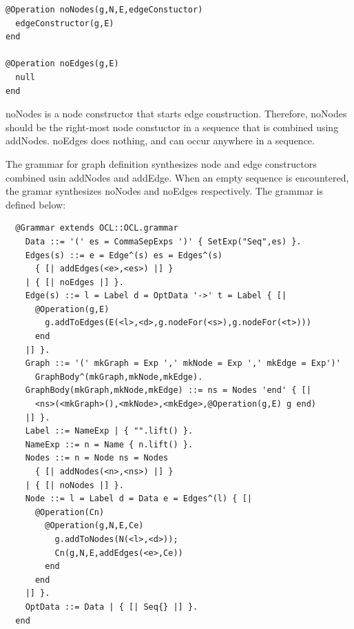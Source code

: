 \begin{lstlisting}
@Operation noNodes(g,N,E,edgeConstuctor)
  edgeConstructor(g,E)
end

@Operation noEdges(g,E)
  null
end
\end{lstlisting}
noNodes is a node constructor that starts edge construction. Therefore,
noNodes should be the right-most node constuctor in a sequence that
is combined using addNodes. noEdges does nothing, and can occur anywhere
in a sequence.

The grammar for graph definition synthesizes node and edge constructors
combined usin addNodes and addEdge. When an empty sequence is encountered,
the gramar synthesizes noNodes and noEdges respectively. The grammar
is defined below:

\begin{lstlisting}
  @Grammar extends OCL::OCL.grammar
    Data ::= '(' es = CommaSepExps ')' { SetExp("Seq",es) }.
    Edges(s) ::= e = Edge^(s) es = Edges^(s) 
      { [| addEdges(<e>,<es>) |] } 
    | { [| noEdges |] }.
    Edge(s) ::= l = Label d = OptData '->' t = Label { [| 
      @Operation(g,E)
        g.addToEdges(E(<l>,<d>,g.nodeFor(<s>),g.nodeFor(<t>)))
      end 
    |] }.
    Graph ::= '(' mkGraph = Exp ',' mkNode = Exp ',' mkEdge = Exp')' 
      GraphBody^(mkGraph,mkNode,mkEdge).
    GraphBody(mkGraph,mkNode,mkEdge) ::= ns = Nodes 'end' { [| 
      <ns>(<mkGraph>(),<mkNode>,<mkEdge>,@Operation(g,E) g end) 
    |] }.
    Label ::= NameExp | { "".lift() }.
    NameExp ::= n = Name { n.lift() }.
    Nodes ::= n = Node ns = Nodes 
      { [| addNodes(<n>,<ns>) |] } 
    | { [| noNodes |] }.
    Node ::= l = Label d = Data e = Edges^(l) { [|
      @Operation(Cn)
        @Operation(g,N,E,Ce)
          g.addToNodes(N(<l>,<d>));
          Cn(g,N,E,addEdges(<e>,Ce))
        end
      end
    |] }.
    OptData ::= Data | { [| Seq{} |] }.
  end
\end{lstlisting}
